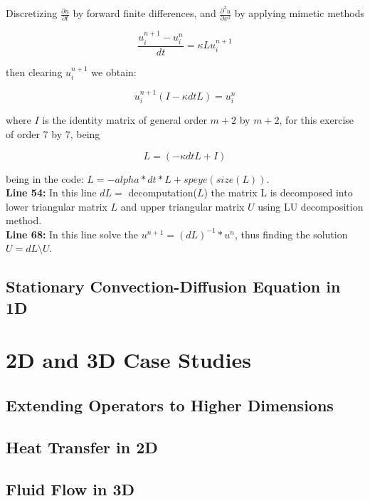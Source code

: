 Discretizing $\frac{\partial u}{\partial t}$ by forward finite differences, and $\frac{\partial^{2} u}{\partial x^{2}}$ by applying mimetic methods

\begin{equation}
	\frac{u^{n+1}_{i} - u^{n}_{i} }{dt} = \kappa L 	u^{n+1}_{i}
\end{equation}

then clearing $u^{n+1}_{i}$ we obtain:


\begin{equation}
	u^{n+1}_{i}(I - \kappa dt L ) = u^{n}_{i}
\end{equation}

where $I$ is the identity matrix of general order $m+2$ by $m+2$, for this exercise of order $7$ by $7$, being

$$  L = (-\kappa dt L + I)$$

being in the code: $ L = -alpha*dt*L +speye(size(L))$.\\

\textbf{Line 54:} In this line $dL=$ decomputation($L$) the matrix L is decomposed into lower triangular matrix $L$ and upper triangular matrix $U$ using LU decomposition method.\\

\textbf{Line 68:} In this line solve the $u^{n+1} =(dL)^{-1}*u^{n}$, thus finding the solution $U=dL \setminus U$.\\

\section{Stationary Convection-Diffusion Equation in 1D}

\chapter{2D and 3D Case Studies}

\section{Extending Operators to Higher Dimensions}

\section{Heat Transfer in 2D}

\section{Fluid Flow in 3D}

